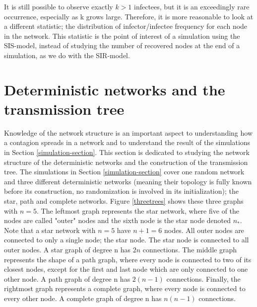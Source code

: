 \documentclass[12pt]{article} %
\numberwithin{equation}{section}
\begin{document}
It is still possible to observe exactly $k>1$ infectees, but it is an exceedingly rare occurrence, especially as k grows large. Therefore, it is more reasonable to look at a different statistic; the distribution of infector/infectee frequency for each node in the network. This statistic is the point of interest of a simulation using the SIS-model, instead of studying the number of recovered nodes at the end of a simulation, as we do with the SIR-model.

\section{Deterministic networks and the transmission tree}\label{tree-section}
Knowledge of the network structure is an important aspect to understanding how a contagion spreads in a network and to understand the result of the simulations in Section \ref{simulation-section}. This section is dedicated to studying the network structure of the deterministic networks and the construction of the transmission tree. The simulations in Section \ref{simulation-section} cover one random network and three different deterministic networks (meaning their topology is fully known before its construction, no randomization is involved in its initialization); the star, path and complete networks. Figure \ref{threetrees} shows these three graphs with $n=5$. The leftmost graph represents the star network, where five of the nodes are called "outer" nodes and the sixth node is the star node denoted $n_*$. Note that a star network with $n=5$ have $n+1=6$ nodes. All outer nodes are connected to only a single node; the star node. The star node is connected to all outer nodes. A star graph of degree n has $2n$ connections. The middle graph represents the shape of a path graph, where every node is connected to two of its closest nodes, except for the first and last node which are only connected to one other node. A path graph of degree n has $2(n-1)$ connections. Finally, the rightmost graph represents a complete graph, where every node is connected to every other node. A complete graph of degree n has $n(n-1)$ connections.
\end{document}
